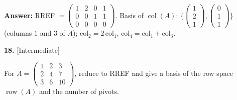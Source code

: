\documentclass[11pt]{article}
\begin{document}
\begin{tcolorbox}[breakable,colback=ans,colframe=ansb,boxrule=0.5pt,left=4pt,right=4pt,top=2pt,bottom=2pt]
\begin{enumerate}[leftmargin=2.2em,itemsep=1pt,topsep=1pt,label=\textbf{Step \arabic*.}]
\end{enumerate}\textbf{Answer:} RREF $=\begin{pmatrix}1 & 2 & 0 & 1 \\ 0 & 0 & 1 & 1 \\ 0 & 0 & 0 & 0\end{pmatrix}$. Basis of $\operatorname{col}(A)$: $\{\begin{pmatrix}1\\2\\1\end{pmatrix},\begin{pmatrix}0\\1\\1\end{pmatrix}\}$ (columns $1$ and $3$ of $A$); $\text{col}_2=2\,\text{col}_1$, $\text{col}_4=\text{col}_1+\text{col}_3$.\end{tcolorbox}
\par\vspace{2pt}
\begin{minipage}{\linewidth}\textbf{18.} \hfill{\scriptsize\color{ink}[Intermediate]}\par\nopagebreak For $A=\begin{pmatrix}1 & 2 & 3 \\ 2 & 4 & 7 \\ 3 & 6 & 10\end{pmatrix}$, reduce to RREF and give a basis of the row space $\operatorname{row}(A)$ and the number of pivots.
\end{minipage}\par\nopagebreak
\end{document}

